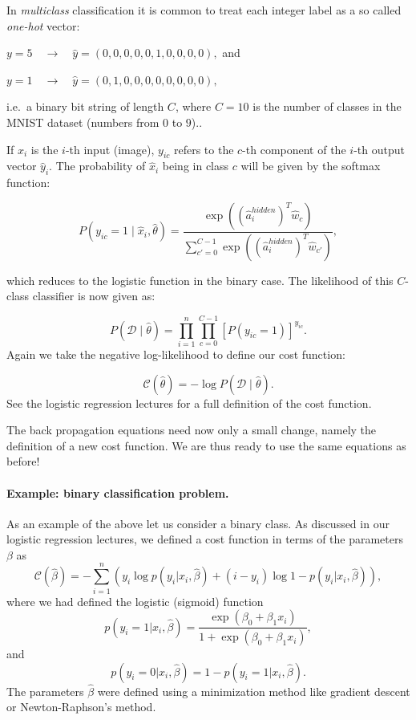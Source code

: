 \documentclass[%
oneside,                 %
final,                   %
10pt]{article}
\begin{document}
In \emph{multiclass} classification it is common to treat each integer label as a so called \emph{one-hot} vector:  

$y = 5 \quad \rightarrow \quad \hat{y} = (0, 0, 0, 0, 0, 1, 0, 0, 0, 0) ,$ and


$y = 1 \quad \rightarrow \quad \hat{y} = (0, 1, 0, 0, 0, 0, 0, 0, 0, 0) ,$ 


i.e.~a binary bit string of length $C$, where $C = 10$ is the number of classes in the MNIST dataset (numbers from $0$ to $9$)..  

If $\hat{x}_i$ is the $i$-th input (image), $y_{ic}$ refers to the $c$-th component of the $i$-th
output vector $\hat{y}_i$.  
The probability of $\hat{x}_i$ being in class $c$ will be given by the softmax function:  

\[
P(y_{ic} = 1 \mid \hat{x}_i, \hat{\theta}) = \frac{\exp{((\hat{a}_i^{hidden})^T \hat{w}_c)}}
{\sum_{c'=0}^{C-1} \exp{((\hat{a}_i^{hidden})^T \hat{w}_{c'})}} ,
\]

which reduces to the logistic function in the binary case.  
The likelihood of this $C$-class classifier
is now given as:  

\[
P(\mathcal{D} \mid \hat{\theta}) = \prod_{i=1}^n \prod_{c=0}^{C-1} [P(y_{ic} = 1)]^{y_{ic}} .
\]
Again we take the negative log-likelihood to define our cost function:  

\[
\mathcal{C}(\hat{\theta}) = - \log{P(\mathcal{D} \mid \hat{\theta})}.
\]
See the logistic regression lectures for a full definition of the cost function.

The back propagation equations need now only a small change, namely the definition of a new cost function. We are thus ready to use the same equations as before!

\paragraph{Example: binary classification problem.}
As an example of the above let us consider a binary class. As discussed in our logistic regression lectures, we defined a cost function in terms of the parameters $\beta$ as
\[
\mathcal{C}(\hat{\beta}) = - \sum_{i=1}^n \left(y_i\log{p(y_i \vert x_i,\hat{\beta})}+(i-y_i)\log{1-p(y_i \vert x_i,\hat{\beta})}\right),
\]
where we had defined the logistic (sigmoid) function
\[
p(y_i =1\vert x_i,\hat{\beta})=\frac{\exp{(\beta_0+\beta_1 x_i)}}{1+\exp{(\beta_0+\beta_1 x_i)}},
\]
and
\[
p(y_i =0\vert x_i,\hat{\beta})=1-p(y_i =1\vert x_i,\hat{\beta}).
\]
The parameters $\hat{\beta}$ were defined using a minimization method like gradient descent or Newton-Raphson's method. 
\end{document}
